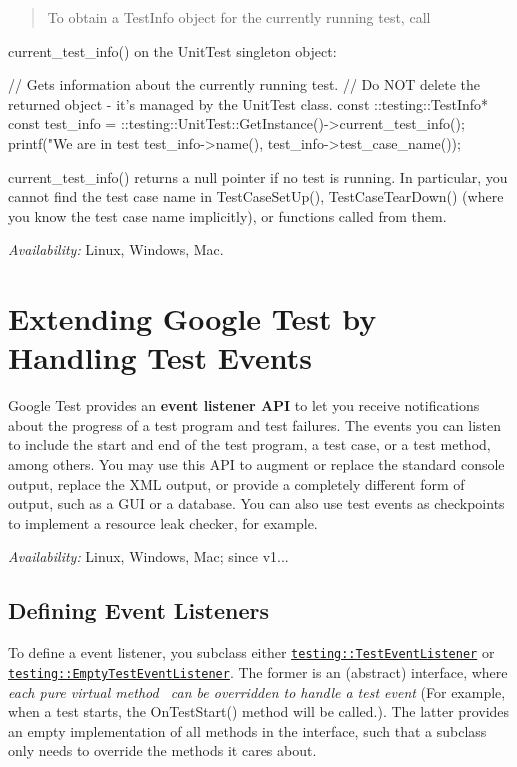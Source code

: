 \begin{quote}
To obtain a {\ttfamily Test\+Info} object for the currently running test, call \end{quote}
{\ttfamily current\+\_\+test\+\_\+info()} on the {\ttfamily Unit\+Test} singleton object\+:


\begin{DoxyCode}
// Gets information about the currently running test.
// Do NOT delete the returned object - it's managed by the UnitTest class.
const ::testing::TestInfo* const test\_info =
  ::testing::UnitTest::GetInstance()->current\_test\_info();
printf("We are in test %
       test\_info->name(), test\_info->test\_case\_name());
\end{DoxyCode}


{\ttfamily current\+\_\+test\+\_\+info()} returns a null pointer if no test is running. In particular, you cannot find the test case name in {\ttfamily Test\+Case\+Set\+Up()}, {\ttfamily Test\+Case\+Tear\+Down()} (where you know the test case name implicitly), or functions called from them.

{\itshape Availability\+:} Linux, Windows, Mac.

\section*{Extending Google Test by Handling Test Events}

Google Test provides an {\bfseries event listener A\+PI} to let you receive notifications about the progress of a test program and test failures. The events you can listen to include the start and end of the test program, a test case, or a test method, among others. You may use this A\+PI to augment or replace the standard console output, replace the X\+ML output, or provide a completely different form of output, such as a G\+UI or a database. You can also use test events as checkpoints to implement a resource leak checker, for example.

{\itshape Availability\+:} Linux, Windows, Mac; since v1...

\subsection*{Defining Event Listeners}

To define a event listener, you subclass either \href{../include/gtest/gtest.h#L855}{\tt testing\+::\+Test\+Event\+Listener} or \href{../include/gtest/gtest.h#L905}{\tt testing\+::\+Empty\+Test\+Event\+Listener}. The former is an (abstract) interface, where {\itshape each pure virtual method~\newline
 can be overridden to handle a test event} (For example, when a test starts, the {\ttfamily On\+Test\+Start()} method will be called.). The latter provides an empty implementation of all methods in the interface, such that a subclass only needs to override the methods it cares about.

